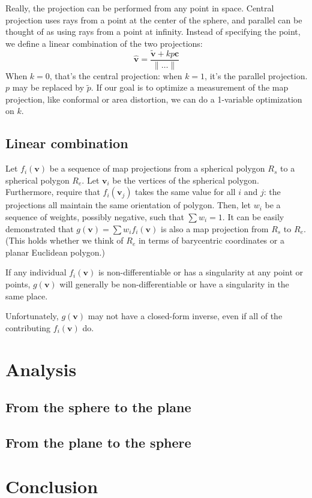 \documentclass{amsart}[12pt]
\begin{document}
Really, the projection can be performed from any point in space. Central
projection uses rays from a point at the center of the sphere, and parallel can
be thought of as using rays from a point at infinity. Instead of specifying the
point, we define a linear combination of the two projections:
\begin{equation}
  \hat{\mathbf v} = \frac{\widetilde{\mathbf v} + kp\mathbf c}{\|\dots\|}
\end{equation}
When $k=0$, that's the central projection: when $k=1$, it's the parallel
projection. $p$ may be replaced by $\widetilde{p}$. If our goal is to optimize
a measurement of the map projection, like conformal or area distortion, we
can do a 1-variable optimization on $k$.

\subsection{Linear combination}

Let $f_i (\mathbf v)$ be a sequence of map projections from a spherical
polygon $R_s$
to a spherical polygon $R_e$.
Let $\mathbf v_i$ be the
vertices of the spherical polygon. Furthermore, require that $f_i(\mathbf v_j)$
takes the same value for all $i$ and $j$: the projections all maintain the same
orientation of polygon. Then, let $w_i$ be a sequence of weights, possibly
negative, such that $\sum w_i = 1$. It can be easily demonstrated that
$g(\mathbf v) = \sum w_i f_i(\mathbf v)$ is also a map projection from $R_s$ to
$R_e$. (This holds whether we think of $R_e$ in terms of barycentric coordinates
or a planar Euclidean polygon.)

If any individual $f_i(\mathbf v)$ is non-differentiable or has a singularity
at any point or points, $g(\mathbf v)$ will generally be non-differentiable or
have a singularity in the same place.

Unfortunately, $g(\mathbf v)$ may not have a closed-form inverse, even if all
of the contributing $f_i(\mathbf v)$ do.

\section{Analysis}
\subsection{From the sphere to the plane}

\subsection{From the plane to the sphere}

\section{Conclusion}



\end{document}
